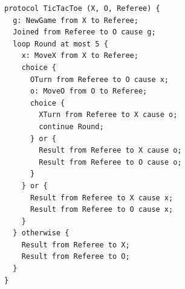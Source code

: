 \begin{lstlisting}[language={},basicstyle=\ttfamily\footnotesize,breaklines=true]
protocol TicTacToe (X, O, Referee) {
  g: NewGame from X to Referee;
  Joined from Referee to O cause g;
  loop Round at most 5 {
    x: MoveX from X to Referee;
    choice {
      OTurn from Referee to O cause x;
      o: MoveO from O to Referee;
      choice {
        XTurn from Referee to X cause o;
        continue Round;
      } or {
        Result from Referee to X cause o;
        Result from Referee to O cause o;
      }
    } or {
      Result from Referee to X cause x;
      Result from Referee to O cause x;
    }
  } otherwise {
    Result from Referee to X;
    Result from Referee to O;
  }
}
\end{lstlisting}
